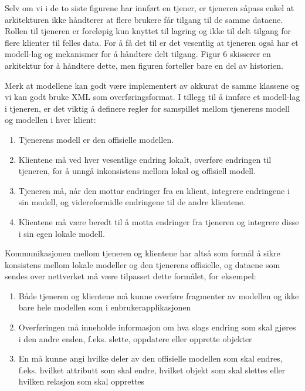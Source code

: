 \documentclass[a4paper]{scrartcl}
\begin{document}
Selv om vi i de to siste figurene har innført en tjener, er tjeneren såpass enkel at arkitekturen ikke håndterer at flere brukere får tilgang til de samme dataene. Rollen til tjeneren er foreløpig kun knyttet til lagring og ikke til delt tilgang for flere klienter til felles data. For å få det til er det vesentlig at tjeneren også har et modell-lag og mekanismer for å håndtere delt tilgang. Figur 6 skisserer en arkitektur for å håndtere dette, men figuren forteller bare en del av historien.

Merk at modellene kan godt være implementert av akkurat de samme klassene og vi kan godt bruke XML som overføringsformat. I tillegg til å innføre et modell-lag i tjeneren, er det viktig å definere regler for samspillet mellom tjenerens modell og modellen i hver klient:

\begin{enumerate}

\item
Tjenerens modell er den offisielle modellen.

\item
Klientene må ved hver vesentlige endring lokalt, overføre endringen til tjeneren, for å unngå inkonsistens mellom lokal og offisiell modell.

\item
Tjeneren må, når den mottar endringer fra en klient, integrere endringene i sin modell, og videreformidle endringene til de andre klientene.

\item
Klientene må være beredt til å motta endringer fra tjeneren og integrere disse i sin egen lokale modell.

\end{enumerate}

Kommunikasjonen mellom tjeneren og klientene har altså som formål å sikre konsistens mellom lokale modeller og den tjenerens offisielle, og dataene som sendes over nettverket må være tilpasset dette formålet, for eksempel:

\begin{enumerate}

\item
Både tjeneren og klientene må kunne overføre fragmenter av modellen og ikke bare hele modellen som i enbrukerapplikasjonen

\item
Overføringen må inneholde informasjon om hva slags endring som skal gjøres i den andre enden, f.eks. slette, oppdatere eller opprette objekter

\item
En må kunne angi hvilke deler av den offisielle modellen som skal endres, f.eks. hvilket attributt som skal endre, hvilket objekt som skal slettes eller hvilken relasjon som skal opprettes

\end{enumerate}
\end{document}
